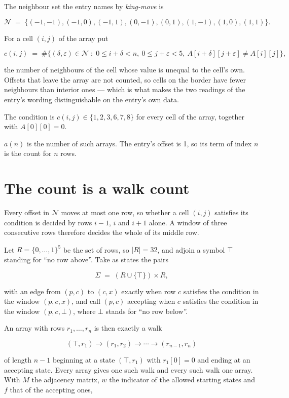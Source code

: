 \documentclass[11pt]{article}
\theoremstyle{definition}
\begin{document}
The neighbour set the entry names by {\itshape king-move} is

\[\mathcal{N} \;=\; \{(-1,-1), (-1,0), (-1,1), (0,-1), (0,1), (1,-1), (1,0), (1,1)\}.\]

For a cell $(i,j)$ of the array put

\[c(i,j) \;=\; \#\bigl\{(\delta,\varepsilon)\in\mathcal{N} \;:\; 0\le i+\delta<n,\ 0\le j+\varepsilon<5,\ A[i+\delta][j+\varepsilon] \neq A[i][j]\bigr\},\]

the number of neighbours of the cell whose value is unequal to the cell's own. Offsets that leave the array are not counted, so cells on the border have fewer neighbours than interior ones --- which is what makes the two readings of the entry's wording distinguishable on the entry's own data.

The condition is $c(i,j) \in \{1, 2, 3, 6, 7, 8\}$ for every cell of the array, together with $A[0][0]=0$.

$a(n)$ is the number of such arrays. The entry's offset is 1, so its term of index $n$ is the count for $n$ rows.

\section{The count is a walk count}

Every offset in $\mathcal{N}$ moves at most one row, so whether a cell $(i,j)$ satisfies its condition is decided by rows $i-1$, $i$ and $i+1$ alone. A window of three consecutive rows therefore decides the whole of its middle row.

Let $R = \{0,\dots,1\}^{5}$ be the set of rows, so $|R| = 32$, and adjoin a symbol $\top$ standing for ``no row above''. Take as states the pairs

\[\Sigma \;=\; (R \cup \{\top\}) \times R,\]

with an edge from $(p,c)$ to $(c,x)$ exactly when row $c$ satisfies the condition in the window $(p,c,x)$, and call $(p,c)$ accepting when $c$ satisfies the condition in the window $(p,c,\bot)$, where $\bot$ stands for ``no row below''.

An array with rows $r_1,\dots,r_n$ is then exactly a walk

\[(\top,r_1) \to (r_1,r_2) \to \cdots \to (r_{n-1},r_n)\]

of length $n-1$ beginning at a state $(\top,r_1)$ with $r_1[0]=0$ and ending at an accepting state. Every array gives one such walk and every such walk one array. With $M$ the adjacency matrix, $w$ the indicator of the allowed starting states and $f$ that of the accepting ones,
\end{document}
